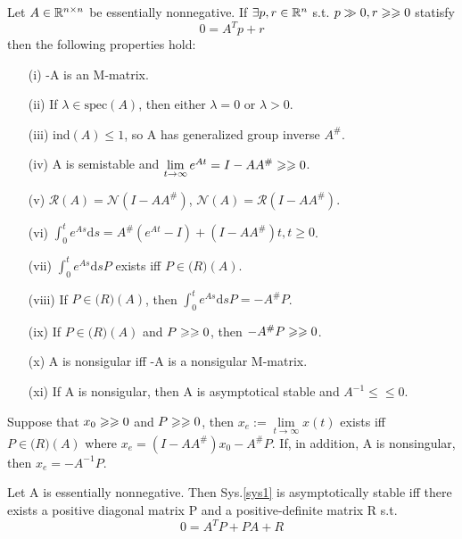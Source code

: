 \documentclass{paper}
\begin{document}
\begin{thm}
Let $A\in \mathbb{R}^{n\times n}$ be essentially nonnegative. If $\exists p,r \in\mathbb{R}^{n}$ s.t. $p\gg 0, r\geqslant\geqslant 0$
statisfy 
\begin{equation}\label{en_cond}
0=A^Tp+r
\end{equation}
then the following properties hold:
\begin{enumerate}
\item[(i)]    -A is an M-matrix.
\item[(ii)]   If $\lambda\in\mathrm{spec}(A)$, then either $\lambda=0$ or $\lambda>0$.
\item[(iii)]  ind$(A)\leqslant 1$, so A has generalized group inverse $A^\#$.
\item[(iv)]   A is semistable and $\lim\limits_{t\rightarrow\infty}e^{At}=I-AA^{\#}\geqslant\geqslant 0$.
\item[(v)]    $\mathcal{R}(A)=\mathcal{N}(I-AA^{\#})$, $\mathcal{N}(A)=\mathcal{R}(I-AA^{\#})$.
\item[(vi)]   $\int_{0}^{t}e^{As}\mathrm{d}s=A^\#(e^{At}-I)+(I-AA^\#)t,t\geqslant 0$.
\item[(vii)]  $\int_{0}^{t}e^{As}\mathrm{d}sP$ exists iff $P\in\mathcal(R)(A)$.
\item[(viii)] If $P\in\mathcal(R)(A)$, then  $\int_{0}^{t}e^{As}\mathrm{d}sP=-A^\#P$.
\item[(ix)]   If $P\in\mathcal(R)(A)$ and $P\geqslant\geqslant 0$, then $-A^\#P\geqslant\geqslant 0$.
\item[(x)]    A is nonsigular iff -A is a nonsigular M-matrix.
\item[(xi)]   If A is nonsigular, then A is asymptotical stable and $A^{-1}\leqslant\leqslant 0$.
\end{enumerate}
\end{thm}
\begin{prop}
Suppose that $x_0\geqslant\geqslant 0$ and $P\geqslant\geqslant 0$, then $x_e:=\lim\limits_{t\rightarrow \infty}x(t)$ exists
iff $P\in\mathcal(R)(A)$ where $x_e=(I-AA^\#)x_0-A^\#P$. If, in addition, A is nonsingular, then
$x_e=-A^{-1}P$.
\end{prop}
\begin{thm}
Let A is essentially nonnegative. Then Sys.\ref{sys1} is asymptotically stable iff there exists a 
positive diagonal matrix P and a positive-definite matrix R s.t. 
\begin{equation}
0=A^TP+PA+R
\end{equation}
\end{thm}
\end{document}
